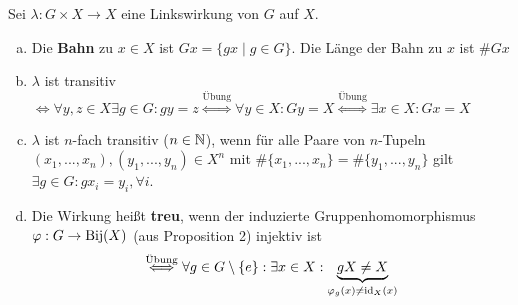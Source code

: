 \documentclass[a4paper]{report}
\begin{document}
\begin{defi}
  Sei $\lambda: G \times X \to X$ eine Linkswirkung von $G$ auf $X$.
  \begin{enumerate}[(a)]
    \item Die \textbf{Bahn} zu $x \in X$ ist $Gx = \{gx \mid g \in G\}$. Die Länge der Bahn zu $x$ ist $\#Gx$
    \item $\lambda$ ist transitiv $\iff \forall y, z \in X \exists g \in G : gy=z \overset{\text{Übung}}\iff \forall y \in X : Gy = X \overset{\text{Übung}}\iff \exists x \in X : Gx = X$
    \item $\lambda$ ist $n$-fach transitiv ($n \in \mathbb{N}$), wenn für alle Paare von $n$-Tupeln $(x_{1}, ..., x_{n}), (y_{1}, ..., y_{n}) \in X^{n}$ mit $\#\{x_{1}, ..., x_{n}\} = \#\{y_{1}, ..., y_{n}\}$ gilt $\exists g \in G : gx_{i} = y_{i}, \forall i$.
    \item Die Wirkung heißt \textbf{treu}, wenn der induzierte Gruppenhomomorphismus $\varphi: G \to \operatorname{Bij}(X)$ (aus Proposition 2) injektiv ist $$\overset{\text{Übung}} \iff \forall g \in G \setminus \{e\} : \exists x \in X : \underbrace{gX \ne X}_{\varphi_{g}(x) \ne \operatorname{id}_{X}(x)}$$
  \end{enumerate}
\end{defi}
\end{document}
